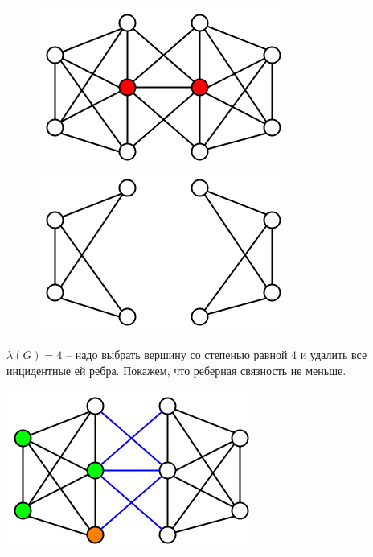 \documentclass[russian]{article}
\begin{document}
\begin{figure}[H]
\begin{minipage}[t]{0.5\columnwidth}%
\begin{center}
\includegraphics[scale=0.45]{6_7a_2.png}
\par\end{center}%
\end{minipage}\hfill{}%
\begin{minipage}[t]{0.5\columnwidth}%
\begin{center}
\includegraphics[scale=0.45]{6_7a_3.png}
\par\end{center}%
\end{minipage}\linebreak{}
\end{figure}


$\lambda(G)=4$ -- надо выбрать вершину со степенью равной 4 и удалить
все инцидентные ей ребра. Покажем, что реберная связность не меньше.

\begin{center}
\includegraphics[scale=0.5]{6_7a_4.png}
\par\end{center}
\end{document}
